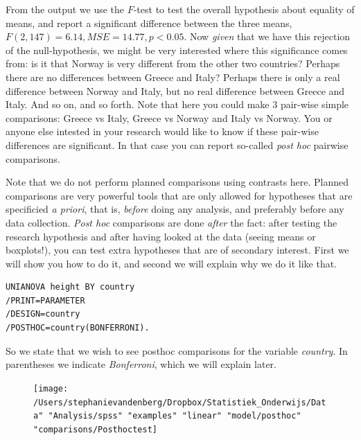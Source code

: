 \documentclass[]{report}\usepackage[]{graphicx}\usepackage[]{color}
\begin{document}
From the output we use the $F$-test to test the overall hypothesis about equality of means, and report a significant difference between the three means, $F(2, 147)=6.14 , MSE=14.77, p<0.05$. Now \textit{given} that we have this rejection of the null-hypothesis, we might be very interested where this significance comes from: is it that Norway is very different from the other two countries? Perhaps there are no differences between Greece and Italy? Perhaps there is only a real difference between Norway
and Italy, but no real difference between Greece and Italy. And so on, and so forth. Note that here you could make 3 pair-wise simple comparisons: Greece vs Italy, Greece vs Norway and Italy vs Norway. You or anyone else intested in your research would like to know if these pair-wise differences are significant. In that case you can report so-called \textit{post hoc} pairwise comparisons. 

Note that we do not perform planned comparisons using contrasts here. Planned comparisons are very powerful tools that are only allowed for hypotheses that are specificied \textit{a priori}, that is, \textit{before} doing any analysis, and preferably before any data collection. \textit{Post hoc} comparisons are done \textit{after} the fact: after testing the research hypothesis and after having looked at the data (seeing means or boxplots!), you can test extra hypotheses that are of secondary interest. First we will show you how to do it, and second we will explain why we do it like that. 

\begin{verbatim}
UNIANOVA height BY country
/PRINT=PARAMETER
/DESIGN=country
/POSTHOC=country(BONFERRONI).
\end{verbatim}

So we state that we wish to see posthoc comparisons for the variable \textit{country}. In parentheses we indicate \textit{Bonferroni}, which we will explain later.

\begin{figure}[h]
    \begin{center}
       \texttt{[image: /Users/stephanievandenberg/Dropbox/Statistiek\_Onderwijs/Data" "Analysis/spss" "examples" "linear" "model/posthoc" "comparisons/Posthoctest]}
    \end{center}
\end{figure}
\end{document}
